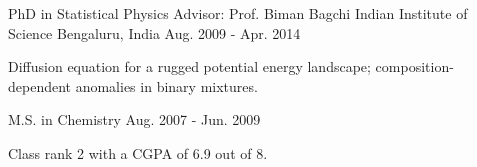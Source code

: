 


\begin{cventries}


\cventry
{PhD in Statistical Physics \quad\textbar\quad Advisor: Prof. Biman Bagchi} %
{Indian Institute of Science} %
{Bengaluru, India} %
{Aug. 2009 - Apr. 2014} %
{ %
\begin{cvitems}
\item {Diffusion equation for a rugged potential energy landscape; composition-dependent anomalies in binary mixtures.}
\end{cvitems}
}

\cventry
{M.S. in Chemistry} %
{} %
{} %
{Aug. 2007 - Jun. 2009} %
{ %
\begin{cvitems}
\item {Class rank 2 with a CGPA of 6.9 out of 8.}
\end{cvitems}
}


\end{cventries}
